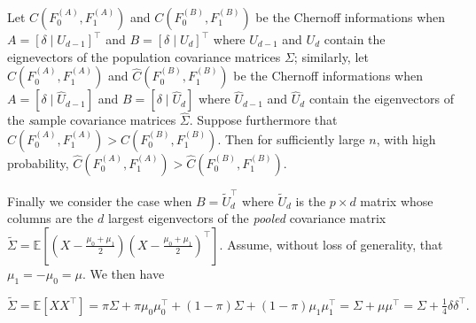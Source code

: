 \documentclass[10pt]{article}
\begin{document}
Let $C(F_0^{(A)}, F_1^{(A)})$ and $C(F_0^{(B)}, F_1^{(B)})$ be the Chernoff informations when $A = [\delta \mid U_{d-1}]^{\top}$ and $B = [\delta \mid U_d]^{\top}$ where $U_{d-1}$ and $U_d$ contain the eignevectors of the population covariance matrices $\Sigma$; similarly, let $\hat{C}(F_0^{(A)}, F_1^{(A)})$ and $\hat{C}(F_0^{(B)}, F_1^{(B)})$ be the Chernoff informations when $A = [\delta \mid \hat{U}_{d-1}]$ and $B = [\delta \mid \hat{U}_d]$ where $\hat{U}_{d-1}$ and $\hat{U}_d$ contain the eigenvectors of the {\emph sample} covariance matrices $\hat{\Sigma}$. Suppose furthermore that $C(F_0^{(A)}, F_1^{(A)}) > C(F_0^{(B)}, F_1^{(B)})$. Then for sufficiently large $n$, with high probability, $\hat{C}(F_0^{(A)}, F_1^{(A)}) > \hat{C}(F_0^{(B)}, F_1^{(B)})$.

Finally we consider the case when $B = \tilde{U}_d^{\top}$ where $\tilde{U}_d$ is the $p \times d$ matrix whose columns are the $d$ largest eigenvectors of the {\em pooled} covariance matrix $\tilde{\Sigma} = \mathbb{E}[(X - \tfrac{\mu_0 + \mu_1}{2})(X - \tfrac{\mu_0 + \mu_1}{2})^{\top}]$. Assume, without loss of generality, that $\mu_1 = -\mu_0 = \mu$. We then have

$$\tilde{\Sigma} = \mathbb{E}[X X^{\top}] = \pi \Sigma + \pi \mu_0 \mu_0^{\top} + (1 - \pi) \Sigma + (1 - \pi) \mu_1 \mu_1^{\top} = \Sigma + \mu \mu^{\top} = \Sigma + \tfrac{1}{4} \delta \delta^{\top}. $$
\end{document}
